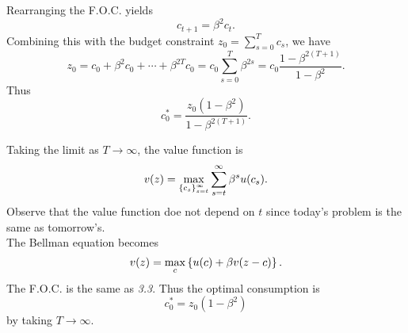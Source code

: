 \documentclass[12pt]{article}
\begin{document}
\begin{sol}[3.3]
    Rearranging the F.O.C. yields 
    \begin{equation*}
        c_{t+1} = \beta^2 c_t.
    \end{equation*}
    Combining this with the budget constraint $z_0 = 
    \sum_{s=0}^{T}c_s$, we have 
    \begin{equation*}
        z_0 = c_0 + \beta^2 c_0 + \cdots + \beta^{2T}c_0 
        = c_0 \sum_{s=0}^{T} \beta^{2s} = c_0 \frac{1-\beta^{2(T+1)}}{1-\beta^2}.
    \end{equation*}
    Thus 
    \begin{equation*}
        c^*_0 = \frac{z_0(1-\beta^2)}{1-\beta^{2(T+1)}}.
    \end{equation*}
\end{sol}
\begin{sol}[3.4]
    Taking the limit as $T\to\infty$, the value function is 
    \begin{equation*}
        v(z) = \max_{\left\{ {c_s} \right\}_{s=t}^\infty} \sum_{s=t}^\infty \beta^s u(c_s). 
    \end{equation*}
    Observe that the value function doe not depend on $t$ since 
    today's problem is the same as tomorrow's. \\
    The Bellman equation becomes
    \begin{equation*}
        v(z) = \max_{c} \left\{ {u(c) + \beta v(z-c)} \right\}.
    \end{equation*}
    The F.O.C. is the same as \textit{3.3}. Thus the optimal 
    consumption is 
    \begin{equation*}
        c^*_0 = z_0(1-\beta^2)
    \end{equation*}
    by taking $T\to\infty$.
\end{sol}
\end{document}
